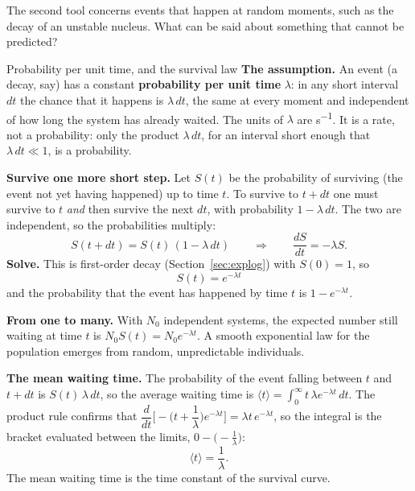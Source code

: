 The second tool concerns events that happen at random moments, such as the decay of an unstable
nucleus. What can be said about something that cannot be predicted?

\begin{derivbox}{Probability per unit time, and the survival law}
\textbf{The assumption.} An event (a decay, say) has a constant \textbf{probability per unit time}
$\lambda$: in any short interval $dt$ the chance that it happens is $\lambda\,dt$, the same at every
moment and independent of how long the system has already waited. The units of $\lambda$ are
\si{s^{-1}}. It is a rate, not a probability: only the product $\lambda\,dt$, for an interval short
enough that $\lambda\,dt\ll1$, is a probability.

 \textbf{Survive one more short step.} Let $S(t)$ be the probability of surviving (the event
not yet having happened) up to time $t$. To survive to $t+dt$ one must survive to $t$ \emph{and} then
survive the next $dt$, with probability $1-\lambda\,dt$. The two are independent, so the probabilities
multiply:
\[
S(t+dt)=S(t)\,(1-\lambda\,dt)\qquad\Longrightarrow\qquad \frac{dS}{dt}=-\lambda S .
\]
 \textbf{Solve.} This is first-order decay (Section~\ref{sec:explog}) with $S(0)=1$, so
\[
\boxed{\;S(t)=e^{-\lambda t}\;}
\]
and the probability that the event has happened by time $t$ is $1-e^{-\lambda t}$.

 \textbf{From one to many.} With $N_0$ independent systems, the expected number still waiting at
time $t$ is $N_0S(t)=N_0e^{-\lambda t}$. A smooth exponential law for the population emerges from random,
unpredictable individuals.

 \textbf{The mean waiting time.} The probability of the event falling between $t$ and $t+dt$ is
$S(t)\,\lambda\,dt$, so the average waiting time is $\langle t\rangle=\int_0^\infty t\,\lambda e^{-\lambda
t}\,dt$. The product rule confirms that
$\dfrac{d}{dt}\Big[-\Big(t+\dfrac1\lambda\Big)e^{-\lambda t}\Big]=\lambda t\,e^{-\lambda t}$, so the
integral is the bracket evaluated between the limits, $0-\big(-\tfrac1\lambda\big)$:
\[
\langle t\rangle=\frac{1}{\lambda}.
\]
The mean waiting time is the time constant of the survival curve.
\end{derivbox}


